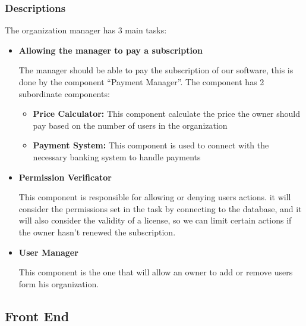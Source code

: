 \documentclass{article}
\begin{document}
\subsubsection{Descriptions}

The organization manager has 3 main tasks:
\begin{itemize}
    \item \textbf{Allowing the manager to pay a subscription}

    The manager should be able to pay the subscription of our software, this is done by the component ``Payment Manager''.
    The component has 2 subordinate components:
    \begin{itemize}
        \item \textbf{Price Calculator: } This component calculate the price the owner should pay based on the number of users in the organization
        \item \textbf{Payment System: } This component is used to connect with the necessary banking system to handle payments
    \end{itemize}

    \item \textbf{Permission Verificator}

    This component is responsible for allowing or denying users actions. it will consider the permissions set in the task by connecting to the database,
    and it will also consider the validity of a license, so we can limit certain actions if the owner hasn't renewed the subscription.

    \item \textbf{User Manager}
    
    This component is the one that will allow an owner to add or remove users form his organization.
\end{itemize}


\subsection{Front End}
\end{document}
